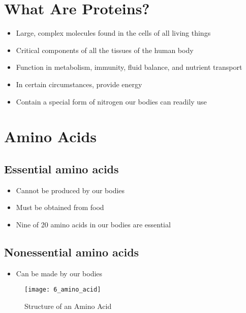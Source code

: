 \documentclass[title={Chapter 6}]{fdsn201notes}
\begin{document}

\section{What Are Proteins?}\label{sec:what-are-proteins?}
\begin{itemize}
	\item Large, complex molecules found in the cells of all living things
	\item Critical components of all the tissues of the human body
	\item Function in metabolism, immunity, fluid balance, and nutrient transport
	\item In certain circumstances, provide energy
	\item Contain a special form of nitrogen our bodies can readily use
\end{itemize}

\section{Amino Acids}\label{sec:amino-acids}

\subsection{Essential amino acids}\label{subsec:essential-amino-acids}
\begin{itemize}
	\item Cannot be produced by our bodies
	\item Must be obtained from food
	\item Nine of 20 amino acids in our bodies are essential
\end{itemize}

\subsection{Nonessential amino acids}\label{subsec:nonessential-amino-acids}
\begin{itemize}
	\item Can be made by our bodies
\end{itemize}

\begin{figure}[H]
	\centering
	\texttt{[image: 6\_amino\_acid]}
	\caption{Structure of an Amino Acid}
	\label{fig:amino-acid-structure}
\end{figure}
\end{document}
